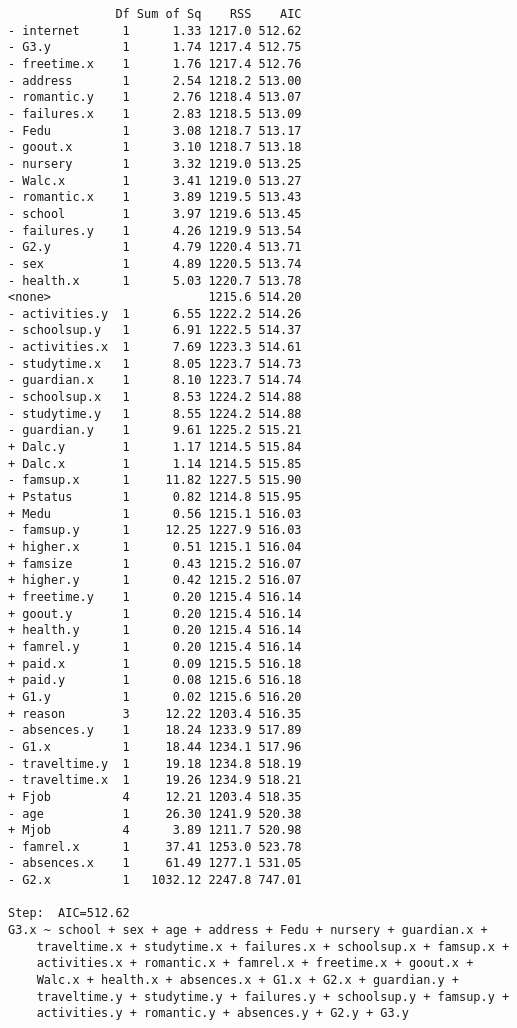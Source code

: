 \documentclass[11pt]{article}
\begin{document}
\begin{enumerate}
\begin{verbatim}
               Df Sum of Sq    RSS    AIC
- internet      1      1.33 1217.0 512.62
- G3.y          1      1.74 1217.4 512.75
- freetime.x    1      1.76 1217.4 512.76
- address       1      2.54 1218.2 513.00
- romantic.y    1      2.76 1218.4 513.07
- failures.x    1      2.83 1218.5 513.09
- Fedu          1      3.08 1218.7 513.17
- goout.x       1      3.10 1218.7 513.18
- nursery       1      3.32 1219.0 513.25
- Walc.x        1      3.41 1219.0 513.27
- romantic.x    1      3.89 1219.5 513.43
- school        1      3.97 1219.6 513.45
- failures.y    1      4.26 1219.9 513.54
- G2.y          1      4.79 1220.4 513.71
- sex           1      4.89 1220.5 513.74
- health.x      1      5.03 1220.7 513.78
<none>                      1215.6 514.20
- activities.y  1      6.55 1222.2 514.26
- schoolsup.y   1      6.91 1222.5 514.37
- activities.x  1      7.69 1223.3 514.61
- studytime.x   1      8.05 1223.7 514.73
- guardian.x    1      8.10 1223.7 514.74
- schoolsup.x   1      8.53 1224.2 514.88
- studytime.y   1      8.55 1224.2 514.88
- guardian.y    1      9.61 1225.2 515.21
+ Dalc.y        1      1.17 1214.5 515.84
+ Dalc.x        1      1.14 1214.5 515.85
- famsup.x      1     11.82 1227.5 515.90
+ Pstatus       1      0.82 1214.8 515.95
+ Medu          1      0.56 1215.1 516.03
- famsup.y      1     12.25 1227.9 516.03
+ higher.x      1      0.51 1215.1 516.04
+ famsize       1      0.43 1215.2 516.07
+ higher.y      1      0.42 1215.2 516.07
+ freetime.y    1      0.20 1215.4 516.14
+ goout.y       1      0.20 1215.4 516.14
+ health.y      1      0.20 1215.4 516.14
+ famrel.y      1      0.20 1215.4 516.14
+ paid.x        1      0.09 1215.5 516.18
+ paid.y        1      0.08 1215.6 516.18
+ G1.y          1      0.02 1215.6 516.20
+ reason        3     12.22 1203.4 516.35
- absences.y    1     18.24 1233.9 517.89
- G1.x          1     18.44 1234.1 517.96
- traveltime.y  1     19.18 1234.8 518.19
- traveltime.x  1     19.26 1234.9 518.21
+ Fjob          4     12.21 1203.4 518.35
- age           1     26.30 1241.9 520.38
+ Mjob          4      3.89 1211.7 520.98
- famrel.x      1     37.41 1253.0 523.78
- absences.x    1     61.49 1277.1 531.05
- G2.x          1   1032.12 2247.8 747.01

Step:  AIC=512.62
G3.x ~ school + sex + age + address + Fedu + nursery + guardian.x + 
    traveltime.x + studytime.x + failures.x + schoolsup.x + famsup.x + 
    activities.x + romantic.x + famrel.x + freetime.x + goout.x + 
    Walc.x + health.x + absences.x + G1.x + G2.x + guardian.y + 
    traveltime.y + studytime.y + failures.y + schoolsup.y + famsup.y + 
    activities.y + romantic.y + absences.y + G2.y + G3.y


\end{verbatim}
\end{enumerate}
\end{document}
